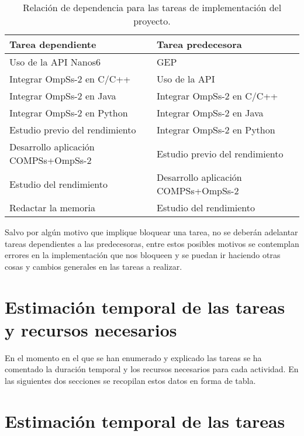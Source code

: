 \begin{table}[H]
 \centering
 \begin{tabular}{|| l | l ||}
    \hline  
    Tarea dependiente & Tarea predecesora \\
    \hline\hline
    Uso de la API Nanos6 & GEP \\
    \hline
    Integrar OmpSs-2 en C/C++ & Uso de la API \\
    \hline
    Integrar OmpSs-2 en Java & Integrar OmpSs-2 en C/C++ \\
    \hline
    Integrar OmpSs-2 en Python & Integrar OmpSs-2 en Java \\
    \hline
    Estudio previo del rendimiento & Integrar OmpSs-2 en Python \\
    \hline
    Desarrollo aplicación COMPSs+OmpSs-2 & Estudio previo del rendimiento \\
    \hline
    Estudio del rendimiento & Desarrollo aplicación COMPSs+OmpSs-2 \\
    \hline
    Redactar la memoria & Estudio del rendimiento \\
    \hline
 \end{tabular}
    \caption{Relación de dependencia para las tareas de implementación del proyecto.}
    \label{table:2}
\end{table}

Salvo por algún motivo que implique bloquear una tarea, no se deberán adelantar tareas dependientes a las predecesoras, entre estos posibles motivos se contemplan errores en la implementación que nos bloqueen y se puedan ir haciendo otras cosas y cambios generales en las tareas a realizar.

\section{Estimación temporal de las tareas y recursos necesarios}

En el momento en el que se han enumerado y explicado las tareas se ha comentado la duración temporal y los recursos necesarios para cada actividad. En las siguientes dos secciones se recopilan estos datos en forma de tabla.

\section{Estimación temporal de las tareas}

